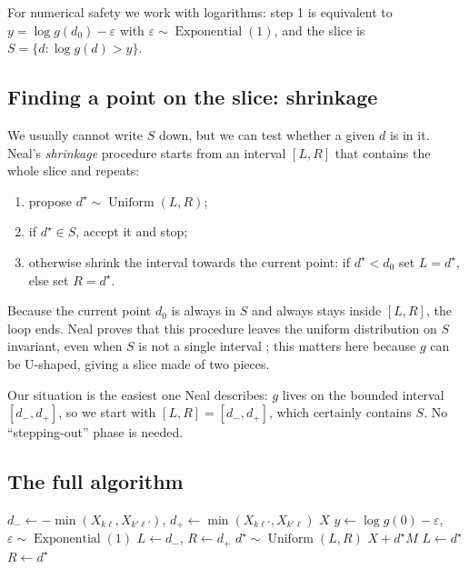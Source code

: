 \documentclass[11pt,a4paper]{article}
\theoremstyle{definition}
\theoremstyle{remark}
\DeclareMathOperator{\Unif}{Uniform}
\DeclareMathOperator{\Expo}{Exponential}
\begin{document}
For numerical safety we work with logarithms: step 1 is equivalent to
$y = \log g(d_0) - \varepsilon$ with $\varepsilon \sim \Expo(1)$, and the
slice is $S = \{d : \log g(d) > y\}$.

\subsection{Finding a point on the slice: shrinkage}

We usually cannot write $S$ down, but we can test whether a given $d$ is in
it. Neal's \emph{shrinkage} procedure \citep[Section~4.2]{neal2003slice}
starts from an interval $[L,R]$ that contains the whole slice and repeats:
\begin{enumerate}
  \item propose $d^\star \sim \Unif(L,R)$;
  \item if $d^\star \in S$, accept it and stop;
  \item otherwise shrink the interval towards the current point: if
        $d^\star < d_0$ set $L = d^\star$, else set $R = d^\star$.
\end{enumerate}
Because the current point $d_0$ is always in $S$ and always stays inside
$[L,R]$, the loop ends. Neal proves that this procedure leaves the uniform
distribution on $S$ invariant, even when $S$ is not a single interval
\citep[Sections~4.2--4.3]{neal2003slice}; this matters here because $g$ can
be U-shaped, giving a slice made of two pieces.

Our situation is the easiest one Neal describes: $g$ lives on the bounded
interval $[d_-, d_+]$, so we start with $[L,R] = [d_-, d_+]$, which certainly
contains $S$. No ``stepping-out'' phase is needed.

\subsection{The full algorithm}

\begin{algorithm}[ht]
\caption{One slice update of a table $X$ along direction $M$
(current step $d_0 = 0$)}
\label{alg:slice}
\begin{algorithmic}[1]
\State $d_- \gets -\min(X_{k\ell}, X_{k'\ell'})$,\;
       $d_+ \gets \min(X_{k\ell'}, X_{k'\ell})$
 \Return $X$ 
\EndIf
\State $y \gets \log g(0) - \varepsilon$, \quad $\varepsilon \sim \Expo(1)$
\State $L \gets d_-$, \quad $R \gets d_+$
\Loop
  \State $d^\star \sim \Unif(L, R)$
    \State \Return $X + d^\star M$
    \State $L \gets d^\star$
  \Else
    \State $R \gets d^\star$
  \EndIf
\EndLoop
\end{algorithmic}
\end{algorithm}
\end{document}
